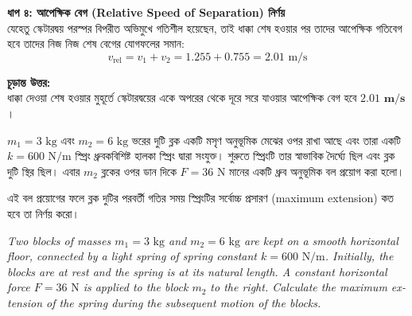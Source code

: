 \documentclass[12pt, a4paper]{article}
\begin{document}
\begin{tcolorbox}[solutionbox={সমাধান (Solution)}]
\vspace{0.5em}
\noindent
\textbf{ধাপ ৪: আপেক্ষিক বেগ (Relative Speed of Separation) নির্ণয়} \\
যেহেতু স্কেটারদ্বয় পরস্পর বিপরীত অভিমুখে গতিশীল হয়েছেন, তাই ধাক্কা শেষ হওয়ার পর তাদের আপেক্ষিক গতিবেগ হবে তাদের নিজ নিজ শেষ বেগের যোগফলের সমান:
$$v_{\text{rel}} = v_1 + v_2 = 1.255 + 0.755 = 2.01\text{ m/s}$$

\vspace{1em}
\begin{tcolorbox}[answerbox]
\textbf{চূড়ান্ত উত্তর:} \\
ধাক্কা দেওয়া শেষ হওয়ার মুহূর্তে স্কেটারদ্বয়ের একে অপরের থেকে দূরে সরে যাওয়ার আপেক্ষিক বেগ হবে $\mathbf{2.01\text{ m/s}}$।
\end{tcolorbox}
\end{tcolorbox}

\begin{tcolorbox}[questionbox={প্রশ্ন (Question) 15}]
\noindent
$m_1 = 3\text{ kg}$ এবং $m_2 = 6\text{ kg}$ ভরের দুটি ব্লক একটি মসৃণ অনুভূমিক মেঝের ওপর রাখা আছে এবং তারা একটি $k = 600\text{ N/m}$ স্প্রিং ধ্রুবকবিশিষ্ট হালকা স্প্রিং দ্বারা সংযুক্ত। শুরুতে স্প্রিংটি তার স্বাভাবিক দৈর্ঘ্যে ছিল এবং ব্লক দুটি স্থির ছিল। এবার $m_2$ ব্লকের ওপর ডান দিকে $F = 36\text{ N}$ মানের একটি ধ্রুব অনুভূমিক বল প্রয়োগ করা হলো। 

\vspace{0.3em}
\noindent
এই বল প্রয়োগের ফলে ব্লক দুটির পরবর্তী গতির সময় স্প্রিংটির সর্বোচ্চ প্রসারণ (maximum extension) কত হবে তা নির্ণয় করো।

\vspace{0.8em}
\begin{english}
\noindent\textit{\color{darkgray}
Two blocks of masses $m_1 = 3\text{ kg}$ and $m_2 = 6\text{ kg}$ are kept on a smooth horizontal floor, connected by a light spring of spring constant $k = 600\text{ N/m}$. Initially, the blocks are at rest and the spring is at its natural length. A constant horizontal force $F = 36\text{ N}$ is applied to the block $m_2$ to the right. Calculate the maximum extension of the spring during the subsequent motion of the blocks.
}
\end{english}
\end{tcolorbox}
\end{document}
